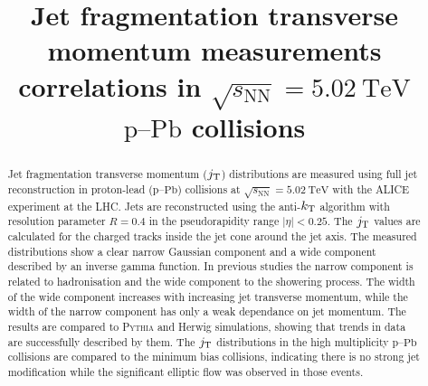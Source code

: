 \documentclass[ALICE,manyauthors]{cernphprep}
\newcommand{\pPb}{\ensuremath{\mbox{p--Pb}}}
\newcommand{\sqrtSnn}{\ensuremath{\sqrt{s_{\mathrm{NN}}}}}
\newcommand{\sqrtSnnE}[2][TeV]{\ensuremath{\sqrtSnn = #2~\mathrm{#1}}}
\def\jt#1{\ensuremath{j_{\rm T#1}}}
\def\kt#1{\ensuremath{k_{\rm T#1}}}
\begin{document}
\begin{titlepage}
%
%

\title{Jet fragmentation transverse momentum measurements correlations in $\sqrtSnnE{5.02}$ $\pPb$ collisions}


\begin{abstract}
Jet fragmentation transverse momentum ($\jt{}$) distributions are measured using full jet reconstruction in proton-lead (\pPb) collisions at $\sqrtSnnE{5.02}$ with the ALICE experiment at the LHC. Jets are reconstructed using the anti-$\kt{}$ algorithm with resolution parameter $R=0.4$ in the pseudorapidity range $|\eta|<0.25$. The $\jt{}$ values are calculated for the charged tracks inside the jet cone around the jet axis. The measured distributions show a clear narrow Gaussian component and a wide component described by an inverse gamma function. In previous studies the narrow component is related to hadronisation and the wide component to the showering process. The width of the wide component increases with increasing jet transverse momentum, while the width of the narrow component has only a weak dependance on jet momentum. The results are compared to \textsc{Pythia} and Herwig simulations, showing that trends in data are successfully described by them. The $\jt{}$ distributions in the high multiplicity $\pPb$ collisions are compared to the minimum bias collisions, indicating there is no strong jet modification while the significant elliptic flow was observed in those events.
\end{abstract}
\end{titlepage}
\setcounter{page}{2}




\newpage
\end{document}
